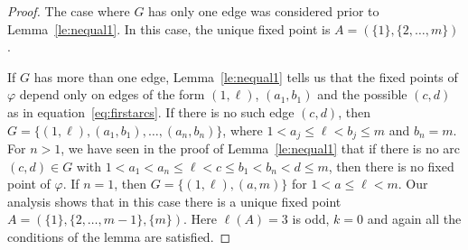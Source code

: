 \begin{proof} 

The case where $G$ has only one edge was considered prior to Lemma~\ref{le:nequal1}. In this case, the unique fixed point is $A=(\{1\},\{2,\ldots,m\})$. 

If $G$ has more than one edge,
Lemma~\ref{le:nequal1} tells us that the fixed points of $\varphi$ depend only on edges of the form
$(1,\ell)$, $(a_1,b_1)$ and the possible $(c,d)$ as in equation~\eqref{eq:firstarcs}. If there is no such edge $(c,d)$, then 
$G=\big\{(1,\ell),(a_1,b_1),\ldots,(a_n,b_n)\big\}$, where $1<a_j\le \ell<b_j\le m$ and $b_n=m$.
For $n>1$, we have seen in the proof of Lemma~\ref{le:nequal1} that if there is no arc $(c,d)\in G$ with $ 1<a_1<a_n \le\ell <c\le b_1<b_n<d\le m$, then there is no fixed point of $\varphi$. 
If $n=1$, then $G=\big\{(1,\ell),(a,m)\big\}$ for $1<a\le \ell<m$. Our analysis shows that in this case there is a unique fixed point $A=(\{1\},\{2,\ldots,m-1\},\{m\})$. Here $\ell(A)=3$ is odd, $k=0$ and 
again all the conditions of the lemma are satisfied.


\end{proof}
